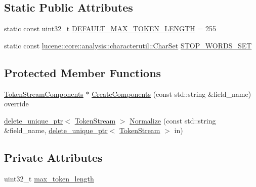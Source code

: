 \subsection*{Static Public Attributes}
\begin{DoxyCompactItemize}
\item 
static const uint32\+\_\+t \mbox{\hyperlink{classlucene_1_1core_1_1analysis_1_1standard_1_1StandardAnalyzer_a3c01017747853f232cdceee30fea7a35}{D\+E\+F\+A\+U\+L\+T\+\_\+\+M\+A\+X\+\_\+\+T\+O\+K\+E\+N\+\_\+\+L\+E\+N\+G\+TH}} = 255
\item 
static const \mbox{\hyperlink{classlucene_1_1core_1_1analysis_1_1characterutil_1_1CharSet}{lucene\+::core\+::analysis\+::characterutil\+::\+Char\+Set}} \mbox{\hyperlink{classlucene_1_1core_1_1analysis_1_1standard_1_1StandardAnalyzer_a43ca4db920b102be1fd2d7c2191fc69e}{S\+T\+O\+P\+\_\+\+W\+O\+R\+D\+S\+\_\+\+S\+ET}}
\end{DoxyCompactItemize}
\subsection*{Protected Member Functions}
\begin{DoxyCompactItemize}
\item 
\mbox{\hyperlink{classlucene_1_1core_1_1analysis_1_1TokenStreamComponents}{Token\+Stream\+Components}} $\ast$ \mbox{\hyperlink{classlucene_1_1core_1_1analysis_1_1standard_1_1StandardAnalyzer_a0d569e3e48f2060a4698481ec1b49d12}{Create\+Components}} (const std\+::string \&field\+\_\+name) override
\item 
\mbox{\hyperlink{namespacelucene_1_1core_1_1analysis_a1ecb3e92b19c3afd8060d81a437a7a3b}{delete\+\_\+unique\+\_\+ptr}}$<$ \mbox{\hyperlink{classlucene_1_1core_1_1analysis_1_1TokenStream}{Token\+Stream}} $>$ \mbox{\hyperlink{classlucene_1_1core_1_1analysis_1_1standard_1_1StandardAnalyzer_aa42382c6504229a195abbc25f048a614}{Normalize}} (const std\+::string \&field\+\_\+name, \mbox{\hyperlink{namespacelucene_1_1core_1_1analysis_a1ecb3e92b19c3afd8060d81a437a7a3b}{delete\+\_\+unique\+\_\+ptr}}$<$ \mbox{\hyperlink{classlucene_1_1core_1_1analysis_1_1TokenStream}{Token\+Stream}} $>$ in)
\end{DoxyCompactItemize}
\subsection*{Private Attributes}
\begin{DoxyCompactItemize}
\item 
uint32\+\_\+t \mbox{\hyperlink{classlucene_1_1core_1_1analysis_1_1standard_1_1StandardAnalyzer_a3f094c0fd3d5efa0c8982e7bee81bbef}{max\+\_\+token\+\_\+length}}
\end{DoxyCompactItemize}
